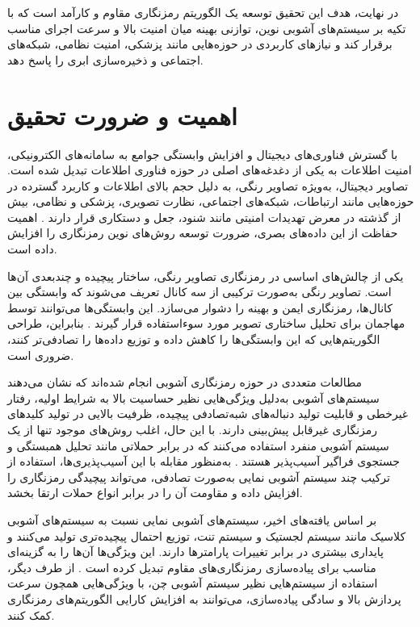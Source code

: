 در نهایت، هدف این تحقیق توسعه یک الگوریتم رمزنگاری مقاوم و کارآمد است که با تکیه بر سیستم‌های آشوبی نوین، توازنی بهینه میان امنیت بالا و سرعت اجرای مناسب برقرار کند و نیازهای کاربردی در حوزه‌هایی مانند پزشکی، امنیت نظامی، شبکه‌های اجتماعی و ذخیره‌سازی ابری را پاسخ دهد.

\section{اهمیت و ضرورت تحقیق}
با گسترش فناوری‌های دیجیتال و افزایش وابستگی جوامع به سامانه‌های الکترونیکی، امنیت اطلاعات به یکی از دغدغه‌های اصلی در حوزه فناوری اطلاعات تبدیل شده است. تصاویر دیجیتال، به‌ویژه تصاویر رنگی، به دلیل حجم بالای اطلاعات و کاربرد گسترده در حوزه‌هایی مانند ارتباطات، شبکه‌های اجتماعی، نظارت تصویری، پزشکی و نظامی، بیش از گذشته در معرض تهدیدات امنیتی مانند شنود، جعل و دستکاری قرار دارند \cite{ref10}. اهمیت حفاظت از این داده‌های بصری، ضرورت توسعه روش‌های نوین رمزنگاری را افزایش داده است.

یکی از چالش‌های اساسی در رمزنگاری تصاویر رنگی، ساختار پیچیده و چندبعدی آن‌ها است. تصاویر رنگی به‌صورت ترکیبی از سه کانال  تعریف می‌شوند که وابستگی بین کانال‌ها، رمزنگاری ایمن و بهینه را دشوار می‌سازد. این وابستگی‌ها می‌توانند توسط مهاجمان برای تحلیل ساختاری تصویر مورد سوءاستفاده قرار گیرند \cite{ref3}. بنابراین، طراحی الگوریتم‌هایی که این وابستگی‌ها را کاهش داده و توزیع داده‌ها را تصادفی‌تر کنند، ضروری است.

مطالعات متعددی در حوزه رمزنگاری آشوبی انجام شده‌اند که نشان می‌دهند سیستم‌های آشوبی به‌دلیل ویژگی‌هایی نظیر حساسیت بالا به شرایط اولیه، رفتار غیرخطی و قابلیت تولید دنباله‌های شبه‌تصادفی پیچیده، ظرفیت بالایی در تولید کلیدهای رمزنگاری غیرقابل پیش‌بینی دارند. با این حال، اغلب روش‌های موجود تنها از یک سیستم آشوبی منفرد استفاده می‌کنند که در برابر حملاتی مانند تحلیل همبستگی و جستجوی فراگیر آسیب‌پذیر هستند \cite{ref12}. به‌منظور مقابله با این آسیب‌پذیری‌ها، استفاده از ترکیب چند سیستم آشوبی نمایی به‌صورت تصادفی، می‌تواند پیچیدگی رمزنگاری را افزایش داده و مقاومت آن را در برابر انواع حملات ارتقا بخشد.

بر اساس یافته‌های اخیر، سیستم‌های آشوبی نمایی نسبت به سیستم‌های آشوبی کلاسیک مانند سیستم لجستیک و سیستم تنت، توزیع احتمال پیچیده‌تری تولید می‌کنند و پایداری بیشتری در برابر تغییرات پارامترها دارند. این ویژگی‌ها آن‌ها را به گزینه‌ای مناسب برای پیاده‌سازی رمزنگاری‌های مقاوم تبدیل کرده است \cite{ref5}. از طرف دیگر، استفاده از سیستم‌هایی نظیر سیستم آشوبی چن، با ویژگی‌هایی همچون سرعت پردازش بالا و سادگی پیاده‌سازی، می‌توانند به افزایش کارایی الگوریتم‌های رمزنگاری کمک کنند.

